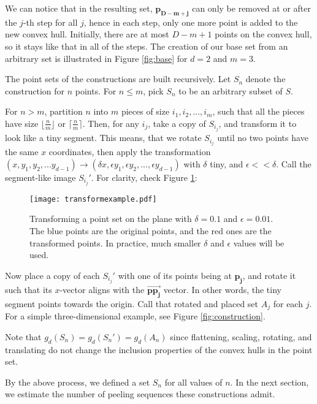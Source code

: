 \documentclass[a4paper,UKenglish,cleveref, autoref, thm-restate]{lipics-v2021}
\begin{document}
  We can notice that in the resulting set, $\mathbf{p_{D-m+j}}$ can only be removed at or after the $j$-th step for all $j$, hence in each step, only one more point is added to the new convex hull. Initially, there are at most $D-m+1$ points on the convex hull, so it stays like that in all of the steps. The creation of our base set from an arbitrary set is illustrated in Figure \ref{fig:base} for $d=2$ and $m=3$.



        The point sets of the constructions are built recursively. Let $S_n$ denote the construction for $n$ points. For $n\leq m$, pick $S_n$ to be an arbitrary subset of $S$.

       For $n>m$, partition $n$ into $m$ pieces of size $i_1,i_2,...,i_m$, such that all the pieces have size $\lfloor \frac nm\rfloor$ or $\lceil \frac nm \rceil$. Then, for any $i_j$, take a copy of $S_{i_j}$, and transform it to look like a tiny segment. This means, that we rotate $S_{i_j}$ until no two points have the same $x$ coordinates, then apply the transformation 
        $(x,y_1,y_2,...y_{d-1})\rightarrow(\delta x,\epsilon y_1, \epsilon y_2,..., \epsilon y_{d-1})$ with $\delta$ tiny, and $\epsilon<<\delta$. Call the segment-like image $S_{i_j}'$. For clarity, check Figure \ref{fig:segment}:

\begin{figure}
	\begin{center}
		\texttt{[image: transformexample.pdf]}
		\caption{Transforming a point set on the plane with $\delta=0.1$ and $\epsilon=0.01$. The blue points are the original points, and the red ones are the transformed points. In practice, much smaller $\delta$ and $\epsilon$ values will be used.}
		\label{fig:segment}
	\end{center}
\end{figure}

 Now place a copy of each $S_{i_j}'$ with one of its points being at $\mathbf{p_j}$, and rotate it such that its $x$-vector aligns with the $\vec{\mathbf{pp_j}}$ vector. In other words, the tiny segment points towards the origin. Call that rotated and placed set $A_j$ for each $j$. For a simple three-dimensional example, see Figure \ref{fig:construction}.


 Note that $g_d(S_n)=g_d(S_n')=g_d(A_n)$ since flattening, scaling, rotating, and translating do not change the inclusion properties of the convex hulls in the point set.

 By the above process, we defined a set $S_n$ for all values of $n$. In the next section, we estimate the number of peeling sequences these constructions admit.
\end{document}
